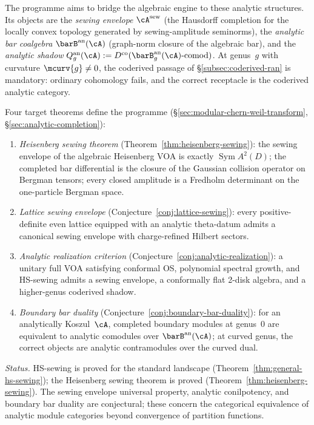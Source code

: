 The programme aims to bridge the algebraic engine to these analytic
structures.  Its objects are the \emph{sewing envelope}
$\cA^{\mathrm{sew}}$ (the Hausdorff completion for the locally convex
topology generated by sewing-amplitude seminorms), the \emph{analytic
bar coalgebra} $\barB^{\mathrm{an}}(\cA)$ (graph-norm closure of the
algebraic bar), and the \emph{analytic shadow}
$Q_g^{\mathrm{an}}(\cA) := D^{\mathrm{co}}(
\barB_g^{\mathrm{an}}(\cA)\text{-comod})$.  At genus~$g$ with
curvature $\mcurv{g} \neq 0$, the coderived passage of
\S\ref{subsec:coderived-ran} is mandatory: ordinary cohomology fails,
and the correct receptacle is the coderived analytic category.

Four target theorems define the programme
(\S\ref{sec:modular-chern-weil-transform},
\S\ref{sec:analytic-completion}):

\begin{enumerate}[label=\textup{(\Alph*$_{\mathrm{an}}$)}]
\item \emph{Heisenberg sewing theorem}
  (Theorem~\ref{thm:heisenberg-sewing}): the sewing envelope
  of the algebraic Heisenberg VOA is exactly
  $\operatorname{Sym} A^2(D)$; the completed bar differential is
  the closure of the Gaussian collision operator on Bergman tensors;
  every closed amplitude is a Fredholm determinant on the
  one-particle Bergman space.
\item \emph{Lattice sewing envelope}
  (Conjecture~\ref{conj:lattice-sewing}): every positive-definite
  even lattice equipped with an analytic theta-datum admits a
  canonical sewing envelope with charge-refined Hilbert sectors.
\item \emph{Analytic realization criterion}
  (Conjecture~\ref{conj:analytic-realization}): a unitary full VOA
  satisfying conformal OS, polynomial spectral growth, and
  HS-sewing admits a sewing envelope, a conformally flat 2-disk
  algebra, and a higher-genus coderived shadow.
\item \emph{Boundary bar duality}
  (Conjecture~\ref{conj:boundary-bar-duality}): for an
  analytically Koszul~$\cA$, completed boundary modules at
  genus~$0$ are equivalent to analytic comodules over
  $\barB^{\mathrm{an}}(\cA)$; at curved genus, the correct
  objects are analytic contramodules over the curved dual.
\end{enumerate}

\noindent
\emph{Status.}  HS-sewing is proved for the standard landscape
(Theorem~\ref{thm:general-hs-sewing}); the Heisenberg sewing
theorem is proved
(Theorem~\ref{thm:heisenberg-sewing}).
The sewing envelope universal property, analytic conilpotency,
and boundary bar duality are conjectural;
these concern the categorical equivalence of analytic module
categories beyond convergence of partition functions.

